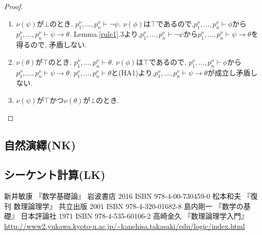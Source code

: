 \begin{proof}
\begin{enumerate}
\begin{enumerate}
\begin{enumerate}
				\item $\nu(\psi)$が$\bot$のとき. $p_1^{\nu},...,p_n^{\nu} \vdash \lnot \psi$.
					  $\nu(\phi)$は$\top$であるので,$p_1^{\nu},...,p_n^{\nu} \vdash \phi$から$p_1^{\nu},...,p_n^{\nu} \vdash \psi \to \theta$.
					  Lemma.\ref{rule1}.3より,$p_1^{\nu},...,p_n^{\nu} \vdash \lnot \psi$から$p_1^{\nu},...,p_n^{\nu} \vdash \psi \to \theta$を得るので,
					  矛盾しない.
				\item $\nu(\theta)$が$\top$のとき. $p_1^{\nu},...,p_n^{\nu} \vdash \theta$. $\nu(\phi)$は$\top$であるので,
					  $p_1^{\nu},...,p_n^{\nu} \vdash \phi$から$p_1^{\nu},...,p_n^{\nu} \vdash \psi \to \theta$.
					  $p_1^{\nu},...,p_n^{\nu} \vdash \theta$と(HA1)より,$p_1^{\nu},...,p_n^{\nu} \vdash \psi \to \theta$が成立し矛盾しない.
				\item $\nu(\psi)$が$\top$かつ$\nu(\theta)$が$\bot$のとき. \newline
					  
			   \end{enumerate}
		\end{enumerate}
 \end{enumerate}
\end{proof}

\subsection{自然演繹(NK)}

\subsection{シーケント計算(LK)}

\begin{thebibliography}{9}
		新井敏康 『数学基礎論』 岩波書店 2016 ISBN 978-4-00-730459-0
		松本和夫 『復刊 数理論理学』 共立出版 2001 ISBN 978-4-320-01682-8
		島内剛一 『数学の基礎』 日本評論社 1971 ISBN 978-4-535-60106-2
		高崎金久 『数理論理学入門』 \url{http://www2.yukawa.kyoto-u.ac.jp/~kanehisa.takasaki/edu/logic/index.html}
\end{thebibliography}
